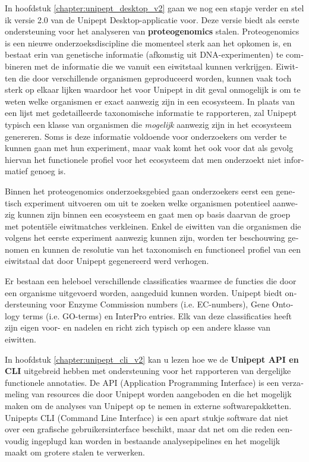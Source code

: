 \begin{otherlanguage}{dutch}
In hoofdstuk \ref{chapter:unipept_desktop_v2} gaan we nog een stapje verder en stel ik versie 2.0 van de Unipept Desktop-applicatie voor.
Deze versie biedt als eerste ondersteuning voor het analyseren van \textbf{proteogenomics} stalen.
Proteogenomics is een nieuwe onderzoeksdiscipline die momenteel sterk aan het opkomen is, en bestaat erin van genetische informatie (afkomstig uit DNA-experimenten) te combineren met de informatie die we vanuit een eiwitstaal kunnen verkrijgen.
Eiwitten die door verschillende organismen geproduceerd worden, kunnen vaak toch sterk op elkaar lijken waardoor het voor Unipept in dit geval onmogelijk is om te weten welke organismen er exact aanwezig zijn in een ecosysteem.
In plaats van een lijst met gedetailleerde taxonomische informatie te rapporteren, zal Unipept typisch een klasse van organismen die \textit{mogelijk} aanwezig zijn in het ecosysteem genereren.
Soms is deze informatie voldoende voor onderzoekers om verder te kunnen gaan met hun experiment, maar vaak komt het ook voor dat als gevolg hiervan het functionele profiel voor het ecosysteem dat men onderzoekt niet informatief genoeg is.

Binnen het proteogenomics onderzoeksgebied gaan onderzoekers eerst een genetisch experiment uitvoeren om uit te zoeken welke organismen potentieel aanwezig kunnen zijn binnen een ecosysteem en gaat men op basis daarvan de groep met potentiële eiwitmatches verkleinen.
Enkel de eiwitten van die organismen die volgens het eerste experiment aanwezig kunnen zijn, worden ter beschouwing genomen en kunnen de resolutie van het taxonomisch en functioneel profiel van een eiwitstaal dat door Unipept gegenereerd werd verhogen.

Er bestaan een heleboel verschillende classificaties waarmee de functies die door een organisme uitgevoerd worden, aangeduid kunnen worden.
Unipept biedt ondersteuning voor Enzyme Commission numbers (i.e. EC-numbers), Gene Ontology terms (i.e. GO-terms) en InterPro entries.
Elk van deze classificaties heeft zijn eigen voor- en nadelen en richt zich typisch op een andere klasse van eiwitten.

In hoofdstuk \ref{chapter:unipept_cli_v2} kan u lezen hoe we de \textbf{Unipept API en CLI} uitgebreid hebben met ondersteuning voor het rapporteren van dergelijke functionele annotaties.
De API (Application Programming Interface) is een verzameling van resources die door Unipept worden aangeboden en die het mogelijk maken om de analyses van Unipept op te nemen in externe softwarepakketten.
Unipepts CLI (Command Line Interface) is een apart stukje software dat niet over een grafische gebruikersinterface beschikt, maar dat net om die reden eenvoudig ingeplugd kan worden in bestaande analysepipelines en het mogelijk maakt om grotere stalen te verwerken.


\end{otherlanguage}
